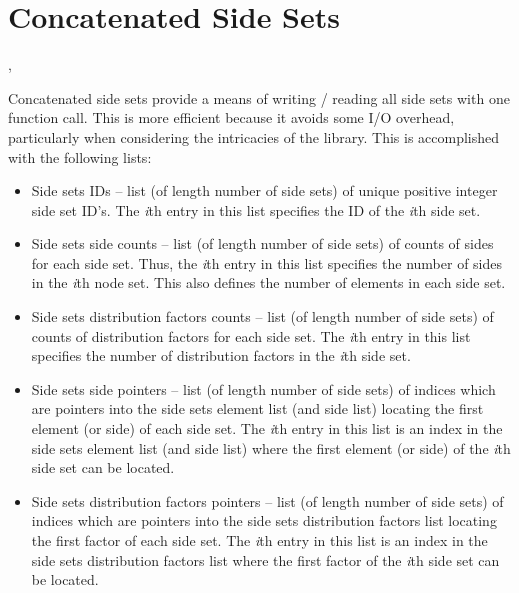 \section{Concatenated Side Sets}

\begin{spacing}{1.5}
\api {}, 
\end{spacing}

Concatenated side sets provide a means of writing / reading all side
sets with one function call. This is more efficient because it avoids
some I/O overhead, particularly when considering the intricacies of
the  library. This is accomplished with the following
lists:
\begin{itemize}
 \item {Side sets IDs -- list (of length number of side sets) of
 unique positive integer side set ID's. The} \textit{{i}}{th entry in
 this list specifies the ID of the} \textit{{i}}{th side set.}

 \item {Side sets side counts -- list (of length number of side sets)
 of counts of sides for each side set. Thus, the} \textit{{i}}{th
 entry in this list specifies the number of sides in the}
 \textit{{i}}{th node set. This also defines the number of elements in
 each side set.}

 \item {Side sets distribution factors counts -- list (of length
 number of side sets) of counts of distribution factors for each side
 set. The} \textit{{i}}{th entry in this list specifies the number of
 distribution factors in the} \textit{{i}}{th side set.}

 \item {Side sets side pointers -- list (of length number of side
 sets) of indices which are pointers into the side sets element list
 (and side list) locating the first element (or side) of each side
 set. The} \textit{{i}}{th entry in this list is an index in the side
 sets element list (and side list) where the first element (or side)
 of the} \textit{{i}}{th side set can be located.}

 \item {Side sets distribution factors pointers -- list (of length
 number of side sets) of indices which are pointers into the side sets
 distribution factors list locating the first factor of each side
 set. The} \textit{{i}}{th entry in this list is an index in the side
 sets distribution factors list where the first factor of the}
 \textit{{i}}{th side set can be located.}


\end{itemize}
